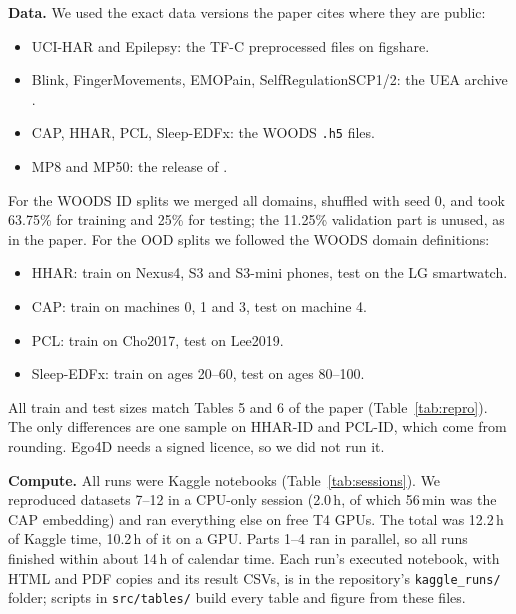 \documentclass[conference]{IEEEtran}
\begin{document}
\textbf{Data.} We used the exact data versions the paper cites where they are public:
\begin{itemize}
\item UCI-HAR and Epilepsy: the TF-C preprocessed files \cite{tfc} on figshare.
\item Blink, FingerMovements, EMOPain, SelfRegulationSCP1/2: the UEA archive \cite{uea}.
\item CAP, HHAR, PCL, Sleep-EDFx: the WOODS \cite{woods} \texttt{.h5} files.
\item MP8 and MP50: the release of \cite{fm4mtsc}.
\end{itemize}
For the WOODS ID splits we merged all domains, shuffled with seed 0, and took 63.75\% for training and 25\% for
testing; the 11.25\% validation part is unused, as in the paper. For the OOD splits we followed the WOODS domain
definitions:
\begin{itemize}
\item HHAR: train on Nexus4, S3 and S3-mini phones, test on the LG smartwatch.
\item CAP: train on machines 0, 1 and 3, test on machine 4.
\item PCL: train on Cho2017, test on Lee2019.
\item Sleep-EDFx: train on ages 20--60, test on ages 80--100.
\end{itemize}
All train and test sizes match Tables 5 and 6 of the paper (Table~\ref{tab:repro}). The only differences are one
sample on HHAR-ID and PCL-ID, which come from rounding. Ego4D \cite{ego4d} needs a signed licence, so we did not run
it.

\textbf{Compute.} All runs were Kaggle notebooks (Table~\ref{tab:sessions}). We reproduced datasets 7--12 in a
CPU-only session (2.0\,h, of which 56\,min was the CAP embedding) and ran everything else on free T4 GPUs. The total
was 12.2\,h of Kaggle time, 10.2\,h of it on a GPU. Parts 1--4 ran in parallel, so all runs finished within about
14\,h of calendar time. Each run's executed notebook, with HTML and PDF copies and its result CSVs, is in the
repository's \texttt{kaggle\_runs/} folder; scripts in \texttt{src/tables/} build every table and figure from these files.

\begin{table}[t]
\caption{Kaggle notebooks we ran, with wall-clock time (including downloads).}
\label{tab:sessions}
\centering
\footnotesize
\setlength{\tabcolsep}{3pt}

\end{table}
\end{document}
